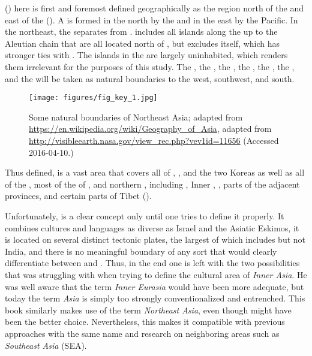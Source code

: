 \newpage 
{} () here is first and foremost defined geographically as the region north of the  and east of the  (). A  is formed in the north by the  and in the east by the Pacific. In the northeast, the  separates  from .  includes all islands along the  up to the Aleutian chain that are all located north of , but excludes  itself, which has stronger ties with . The islands in the  are largely uninhabited, which renders them irrelevant for the purposes of this study. The , the , the , the , the , the , and the  will be taken as natural boundaries to the west, southwest, and south.

\begin{figure}
\texttt{[image: figures/fig\_key\_1.jpg]}
\caption{Some natural boundaries of Northeast Asia;
adapted from 
\url{https://en.wikipedia.org/wiki/Geography_of_Asia}, adapted from \url{http://visibleearth.nasa.gov/view_rec.php?vev1id=11656} (Accessed 2016-04-10.)}
\label{fig:1:1}
\end{figure}

Thus defined,  is a vast area that covers all of , , and the two Koreas as well as all of the , most of the  of , and northern , including , Inner , , parts of the adjacent provinces, and certain parts of Tibet ().

Unfortunately,  is a clear concept only until one tries to define it properly. It combines cultures and languages as diverse as Israel and the Asiatic Eskimos, it is located on several distinct tectonic plates, the largest of which includes  but not India, and there is no meaningful boundary of any sort that would clearly differentiate between  and . Thus, in the end one is left with the two possibilities that \citet{Sinor1990} was struggling with when trying to define the cultural area of \textit{Inner Asia}. He was well aware that the term \textit{Inner Eurasia} would have been more adequate, but today the term \textit{Asia} is simply too strongly conventionalized and entrenched. This book similarly makes use of the term \textit{Northeast Asia}, even though \textit{} might have been the better choice. Nevertheless, this makes it compatible with previous approaches with the same name and research on neighboring areas such as \textit{Southeast Asia} (SEA).

